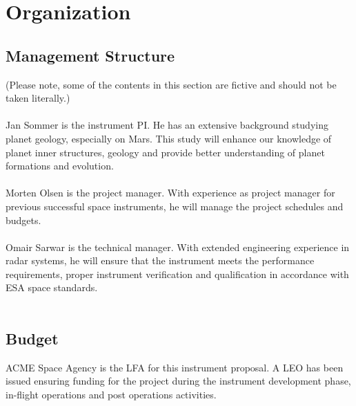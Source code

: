 \section{Organization}
\subsection{Management Structure}
(Please note, some of the contents in this section are fictive and should not be taken literally.)\\\\
%
\noindent
Jan Sommer is the instrument \ac{PI}. He has an extensive background studying planet geology, especially on Mars. This study will enhance our knowledge of planet inner structures, geology and provide better understanding of planet formations and evolution.\\\\
%
\noindent
Morten Olsen is the project manager. With experience as project manager for previous successful space instruments, he will manage the project schedules and budgets.\\\\
%
\noindent
Omair Sarwar is the technical manager. With extended engineering experience in radar systems, he will ensure that the instrument meets the performance requirements, proper instrument verification and qualification in accordance with ESA space standards.\\\\
%
\subsection{Budget}
ACME Space Agency is the \ac{LFA} for this instrument proposal. A \ac{LEO} has been issued ensuring funding for the project during the instrument development phase, in-flight operations and post operations activities.